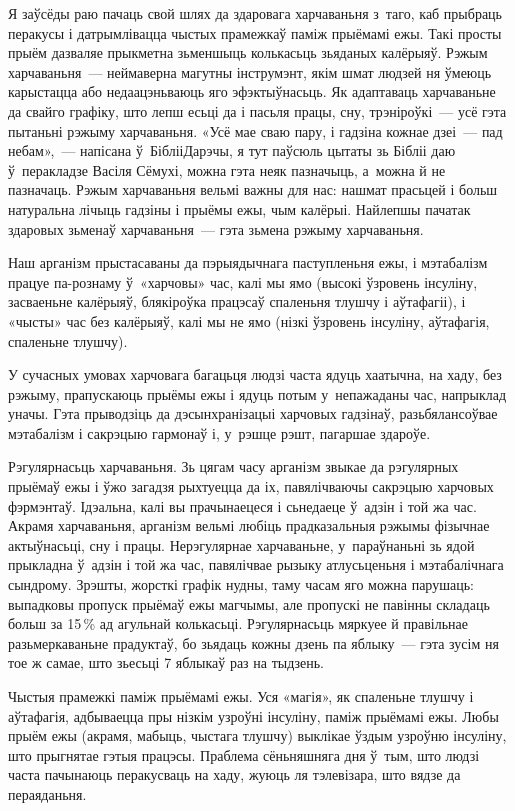 Я заўсёды раю пачаць свой шлях да здаровага харчаваньня з~таго, каб прыбраць перакусы і датрымлівацца чыстых прамежкаў паміж прыёмамі ежы. Такі просты прыём дазваляе прыкметна зьменшыць колькасьць зьяданых калёрыяў. Рэжым харчаваньня~--- неймаверна магутны інструмэнт, якім шмат людзей ня ўмеюць карыстацца або недаацэньваюць яго эфэктыўнасьць. Як адаптаваць харчаваньне да свайго графіку, што лепш есьці да і пасьля працы, сну, трэніроўкі~--- усё гэта пытаньні рэжыму харчаваньня. «Усё мае сваю пару, і гадзіна кожнае дзеі~--- пад небам»,~--- напісана ў~БіблііДарэчы, я тут паўсюль цытаты зь Бібліі даю ў~перакладзе Васіля Сёмухі, можна гэта неяк пазначыць, а~можна й не пазначаць. Рэжым харчаваньня вельмі важны для нас: нашмат прасьцей і больш натуральна лічыць гадзіны і прыёмы ежы, чым калёрыі. Найлепшы пачатак здаровых зьменаў харчаваньня~--- гэта зьмена рэжыму харчаваньня.

Наш арганізм прыстасаваны да пэрыядычнага паступленьня ежы, і мэтабалізм працуе па-рознаму ў~«харчовы» час, калі мы ямо (высокі ўзровень інсуліну, засваеньне калёрыяў, блякіроўка працэсаў спаленьня тлушчу і аўтафагіі), і «чысты» час без калёрыяў, калі мы не ямо (нізкі ўзровень інсуліну, аўтафагія, спаленьне тлушчу).

У сучасных умовах харчовага багацьця людзі часта ядуць хаатычна, на хаду, без рэжыму, прапускаюць прыёмы ежы і ядуць потым у~непажаданы час, напрыклад уначы. Гэта прыводзіць да дэсынхранізацыі харчовых гадзінаў, разьбялансоўвае мэтабалізм і сакрэцыю гармонаў і, у~рэшце рэшт, пагаршае здароўе.

Рэгулярнасьць харчаваньня. Зь цягам часу арганізм звыкае да рэгулярных прыёмаў ежы і ўжо загадзя рыхтуецца да іх, павялічваючы сакрэцыю харчовых фэрмэнтаў. Ідэальна, калі вы прачынаецеся і сьнедаеце ў~адзін і той жа час. Акрамя харчаваньня, арганізм вельмі любіць прадказальныя рэжымы фізычнае актыўнасьці, сну і працы. Нерэгулярнае харчаваньне, у~параўнаньні зь ядой прыкладна ў~адзін і той жа час, павялічвае рызыку атлусьценьня і мэтабалічнага сындрому. Зрэшты, жорсткі графік нудны, таму часам яго можна парушаць: выпадковы пропуск прыёмаў ежы магчымы, але пропускі не павінны складаць больш за 15\,\% ад агульнай колькасьці. Рэгулярнасьць мяркуее й правільнае разьмеркаваньне прадуктаў, бо зьядаць кожны дзень па яблыку~--- гэта зусім ня тое ж самае, што зьесьці 7 яблыкаў раз на тыдзень.

Чыстыя прамежкі паміж прыёмамі ежы. Уся «магія», як спаленьне тлушчу і аўтафагія, адбываецца пры нізкім узроўні інсуліну, паміж прыёмамі ежы. Любы прыём ежы (акрамя, мабыць, чыстага тлушчу) выклікае ўздым узроўню інсуліну, што прыгнятае гэтыя працэсы. Праблема сёньняшняга дня ў~тым, што людзі часта пачынаюць перакусваць на хаду, жуюць ля тэлевізара, што вядзе да пераяданьня.

